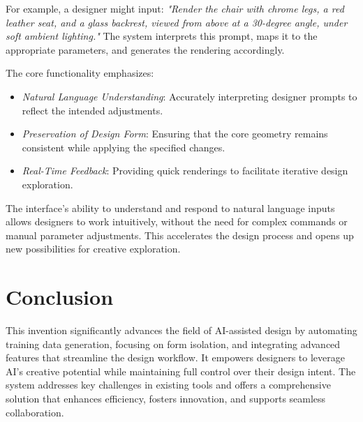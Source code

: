 \documentclass{article}
\begin{document}
For example, a designer might input: \textit{"Render the chair with chrome legs, a red leather seat, and a glass backrest, viewed from above at a 30-degree angle, under soft ambient lighting."} The system interprets this prompt, maps it to the appropriate parameters, and generates the rendering accordingly.

The core functionality emphasizes:

\begin{itemize}
    \item \textit{Natural Language Understanding}: Accurately interpreting designer prompts to reflect the intended adjustments.
    \item \textit{Preservation of Design Form}: Ensuring that the core geometry remains consistent while applying the specified changes.
    \item \textit{Real-Time Feedback}: Providing quick renderings to facilitate iterative design exploration.
\end{itemize}

The interface's ability to understand and respond to natural language inputs allows designers to work intuitively, without the need for complex commands or manual parameter adjustments. This accelerates the design process and opens up new possibilities for creative exploration.


\section{Conclusion}

This invention significantly advances the field of AI-assisted design by automating training data generation, focusing on form isolation, and integrating advanced features that streamline the design workflow. It empowers designers to leverage AI's creative potential while maintaining full control over their design intent. The system addresses key challenges in existing tools and offers a comprehensive solution that enhances efficiency, fosters innovation, and supports seamless collaboration.
\end{document}

